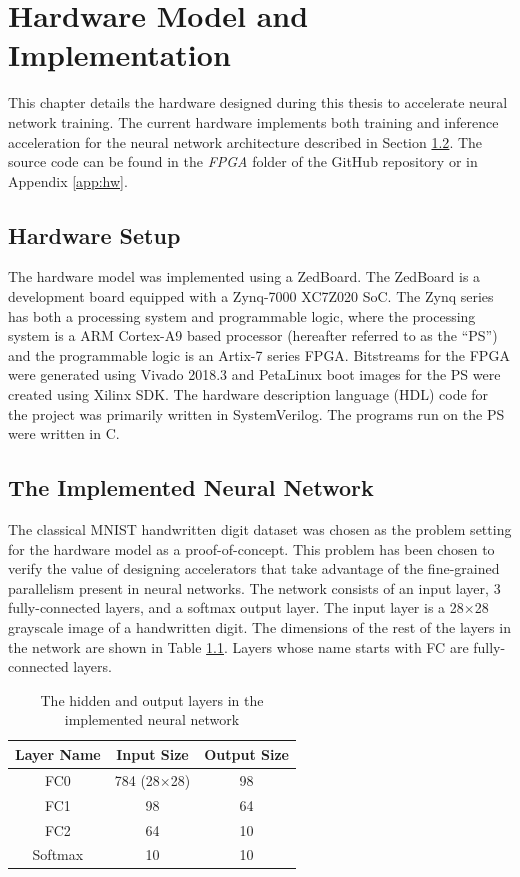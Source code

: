 \chapter{Hardware Model and Implementation}\label{hw-model}

This chapter details the hardware designed during this thesis to accelerate neural network training. The current hardware implements both training and inference acceleration for the neural network architecture described in Section \ref{net-arch}. The source code can be found in the \textit{FPGA} folder of the GitHub repository or in Appendix \ref{app:hw}.
\section{Hardware Setup}
The hardware model was implemented using a ZedBoard. The ZedBoard is a development board equipped with a Zynq-7000 XC7Z020 SoC. The Zynq series has both a processing system and programmable logic, where the processing system is a ARM Cortex-A9 based processor (hereafter referred to as the ``PS'') and the programmable logic is an Artix-7 series FPGA. Bitstreams for the FPGA were generated using Vivado 2018.3 and PetaLinux boot images for the PS were created using Xilinx SDK. The hardware description language (HDL) code for the project was primarily written in SystemVerilog. The programs run on the PS were written in C.

\section{The Implemented Neural Network}\label{net-arch}
The classical MNIST handwritten digit dataset was chosen as the problem setting for the hardware model as a proof-of-concept. This problem has been chosen to verify the value of designing accelerators that take advantage of the fine-grained parallelism present in neural networks. The network consists of an input layer, 3 fully-connected layers, and a softmax output layer. The input layer is a 28$\times$28 grayscale image of a handwritten digit. The dimensions of the rest of the layers in the network are shown in Table \ref{net-arch-table}. Layers whose name starts with FC are fully-connected layers.
 
\begin{table}
	\centering
	\begin{tabular}{|c| c| c|}
		\hline
		\textbf{Layer Name}	& \textbf{Input Size} & \textbf{Output Size}\\\hline
		FC0	& 784 (28$\times$28) & 98 \\\hline
		FC1 & 98 & 64 \\\hline
		FC2 & 64 & 10 \\\hline
		Softmax & 10 & 10\\\hline
	\end{tabular}
	\caption{The hidden and output layers in the implemented neural network}
	\label{net-arch-table}
\end{table}

